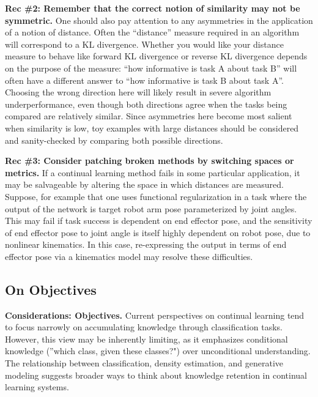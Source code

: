 \textbf{Rec \#2: Remember that the correct notion of similarity may not be symmetric.}
One should also pay attention to any asymmetries in the application of a notion of distance.
Often the ``distance'' measure required in an algorithm will correspond to a KL divergence.
Whether you would like your distance measure to behave like forward KL divergence or reverse KL divergence depends on the purpose of the measure: ``how informative is task A about task B'' will often have a different answer to ``how informative is task B about task A''.
Choosing the wrong direction here will likely result in severe algorithm underperformance, even though both directions agree when the tasks being compared are relatively similar.
Since asymmetries here become most salient when similarity is low, toy examples with large distances should be considered and sanity-checked by comparing both possible directions.

\textbf{Rec \#3: Consider patching broken methods by switching spaces or metrics.}
If a continual learning method fails in some particular application, it may be salvageable by altering the space in which distances are measured.
Suppose, for example that one uses functional regularization in a task where the output of the network is target robot arm pose parameterized by joint angles.
This may fail if task success is dependent on end effector pose, and the sensitivity of end effector pose to joint angle is itself highly dependent on robot pose, due to nonlinear kinematics.
In this case, re-expressing the output in terms of end effector pose via a kinematics model may resolve these difficulties.

\subsection{On Objectives}
\begin{tcolorbox}[colback=orange!10,colframe=orange!50,boxsep=-1pt]
\textbf{Considerations: Objectives.}
Current perspectives on continual learning tend to focus narrowly on accumulating knowledge through 
classification tasks. However, this view may be inherently limiting, as it emphasizes conditional 
knowledge (''which class, given these classes?") over unconditional understanding. The relationship 
between classification, density estimation, and generative modeling suggests broader ways to think 
about knowledge retention in continual learning systems.
\end{tcolorbox}

